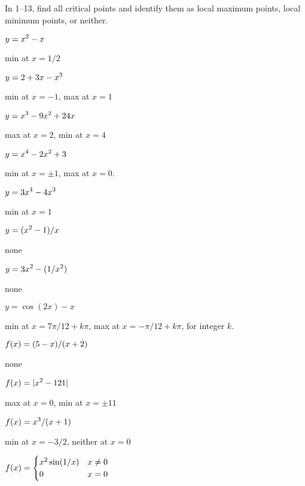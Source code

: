 \begin{exercises}
In 1--13,
find all critical points and identify them as
local maximum points, local minimum points, or neither.

\twocol

\exercise $\displaystyle y=x^2-x$ 
\begin{answer} min at $x=1/2$
\end{answer}

\exercise $\displaystyle y=2+3x-x^3$ 
\begin{answer} min at $x=-1$, max at $x=1$
\end{answer}

\exercise $\displaystyle y=x^3-9x^2+24x$
\begin{answer} max at $x=2$, min at $x=4$
\end{answer}

\exercise $\displaystyle y=x^4-2x^2+3$ 
\begin{answer} min at $x=\pm 1$, max at $x=0$.
\end{answer}

\exercise $\displaystyle y=3x^4-4x^3$
\begin{answer} min at $x=1$
\end{answer}

\exercise $\displaystyle y=(x^2-1)/x$
\begin{answer} none
\end{answer}

\exercise $\displaystyle y=3x^2-(1/x^2)$ 
\begin{answer} none
\end{answer}

\exercise $y=\cos(2x)-x$ 
\begin{answer} min at $x=7\pi/12+k\pi$, max at $x=-\pi/12+k\pi$, for integer $k$.
\end{answer}

\exercise
$\displaystyle f(x) = (5-x)/(x+2)$
\begin{answer} none
\end{answer}

\exercise $\displaystyle f(x) = |x^2 - 121|$
\begin{answer} max at $x=0$, min at $x=\pm 11$
\end{answer}

\exercise $\displaystyle f(x) = x^3/(x+1)$
\begin{answer} min at $x=-3/2$, neither at $x=0$
\end{answer}

\exercise $\displaystyle f(x)= \begin{cases}
x^2 \sin(1/x)  & x\neq 0  \\
 0  & x=0 \end{cases}$


\end{exercises}
